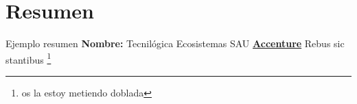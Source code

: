 \blankpage
\newpage
\thispagestyle{empty}
\section*{Resumen}
Ejemplo resumen
\textbf{Nombre:} Tecnilógica Ecosistemas SAU \href{https://www.accenture.com/es-es/company-tecnilogica-accenture}{\textbf{\color{blue}Accenture}}
Rebus sic stantibus \footnote{os la estoy metiendo doblada}
\afterpage{\blankpage}
